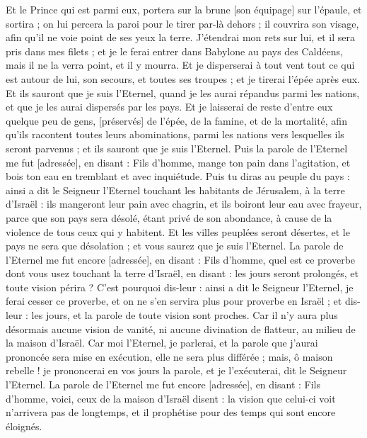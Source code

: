 \begin{multicols}{2}
Et le Prince qui est parmi eux, portera sur la brune [son équipage] sur l'épaule, et sortira ; on lui percera la paroi pour le tirer par-là dehors ; il couvrira son visage, afin qu'il ne voie point de ses yeux la terre.
J'étendrai mon rets sur lui, et il sera pris dans mes filets ; et je le ferai entrer dans Babylone au pays des Caldéens, mais il ne la verra point, et il y mourra.
Et je disperserai à tout vent tout ce qui est autour de lui, son secours, et toutes ses troupes ; et je tirerai l'épée après eux.
Et ils sauront que je suis l'Eternel, quand je les aurai répandus parmi les nations, et que je les aurai dispersés par les pays.
Et je laisserai de reste d'entre eux quelque peu de gens, [préservés] de l'épée, de la famine, et de la mortalité, afin qu'ils racontent toutes leurs abominations, parmi les nations vers lesquelles ils seront parvenus ; et ils sauront que je suis l'Eternel.
Puis la parole de l'Eternel me fut [adressée], en disant :
Fils d'homme, mange ton pain dans l'agitation, et bois ton eau en tremblant et avec inquiétude.
Puis tu diras au peuple du pays : ainsi a dit le Seigneur l'Eternel touchant les habitants de Jérusalem, à la terre d'Israël : ils mangeront leur pain avec chagrin, et ils boiront leur eau avec frayeur, parce que son pays sera désolé, étant privé de son abondance, à cause de la violence de tous ceux qui y habitent.
Et les villes peuplées seront désertes, et le pays ne sera que désolation ; et vous saurez que je suis l'Eternel.
La parole de l'Eternel me fut encore [adressée], en disant :
Fils d'homme, quel est ce proverbe dont vous usez touchant la terre d'Israël, en disant : les jours seront prolongés, et toute vision périra ?
C'est pourquoi dis-leur : ainsi a dit le Seigneur l'Eternel, je ferai cesser ce proverbe, et on ne s'en servira plus pour proverbe en Israël ; et dis-leur : les jours, et la parole de toute vision sont proches.
Car il n'y aura plus désormais aucune vision de vanité, ni aucune divination de flatteur, au milieu de la maison d'Israël.
Car moi l'Eternel, je parlerai, et la parole que j'aurai prononcée sera mise en exécution, elle ne sera plus différée ; mais, ô maison rebelle ! je prononcerai en vos jours la parole, et je l'exécuterai, dit le Seigneur l'Eternel.
La parole de l'Eternel me fut encore [adressée], en disant :
Fils d'homme, voici, ceux de la maison d'Israël disent : la vision que celui-ci voit n'arrivera pas de longtemps, et il prophétise pour des temps qui sont encore éloignés.

\end{multicols}
